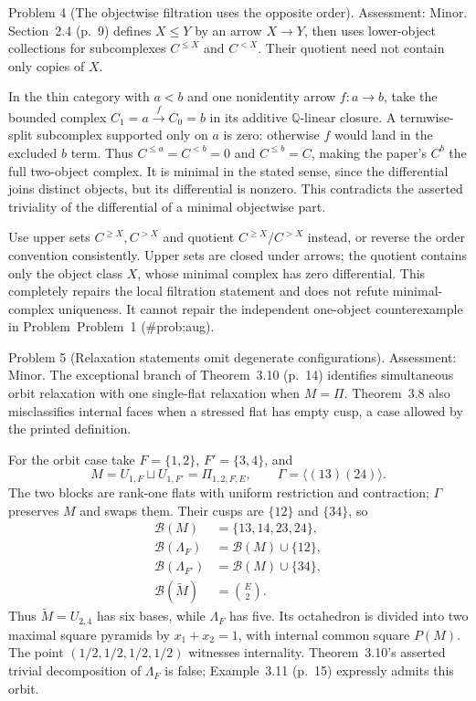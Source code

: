 \documentclass[10pt]{article}
\begin{document}
Problem 4 (The objectwise filtration uses the opposite order).  Assessment: Minor. Section 2.4 (p. 9) defines \(X\leq Y\) by an arrow \(X\to Y\), then uses lower-object collections for subcomplexes \(C^{\leq X}\) and \(C^{<X}\). Their quotient need not contain only copies of \(X\).\par
In the thin category with \(a<b\) and one nonidentity arrow \(f:a\to b\), take the bounded complex \(C_1=a\xrightarrow{f}C_0=b\) in its additive \(\mathbb Q\)-linear closure. A termwise-split subcomplex supported only on \(a\) is zero: otherwise \(f\) would land in the excluded \(b\) term. Thus \(C^{\leq a}=C^{<b}=0\) and \(C^{\leq b}=C\), making the paper’s \(C^b\) the full two-object complex. It is minimal in the stated sense, since the differential joins distinct objects, but its differential is nonzero. This contradicts the asserted triviality of the differential of a minimal objectwise part.\par
Use upper sets \(C^{\geq X},C^{>X}\) and quotient \(C^{\geq X}/C^{>X}\) instead, or reverse the order convention consistently. Upper sets are closed under arrows; the quotient contains only the object class \(X\), whose minimal complex has zero differential. This completely repairs the local filtration statement and does not refute minimal-complex uniqueness. It cannot repair the independent one-object counterexample in Problem Problem 1 (\#prob:aug).\par
Problem 5 (Relaxation statements omit degenerate configurations).  Assessment: Minor. The exceptional branch of Theorem 3.10 (p. 14) identifies simultaneous orbit relaxation with one single-flat relaxation when \(M=\Pi\). Theorem 3.8 also misclassifies internal faces when a stressed flat has empty cusp, a case allowed by the printed definition.\par
For the orbit case take \(F=\{1,2\}\), \(F'=\{3,4\}\), and \[M=U_{1,F}\sqcup U_{1,F'}=\Pi_{1,2,F,E},\qquad
 \Gamma=\langle(13)(24)\rangle.\] The two blocks are rank-one flats with uniform restriction and contraction; \(\Gamma\) preserves \(M\) and swaps them. Their cusps are \(\{12\}\) and \(\{34\}\), so \[\begin{aligned}
 \mathcal B(M)&=\{13,14,23,24\},\\
 \mathcal B(\Lambda_F)&=\mathcal B(M)\cup\{12\},\\
 \mathcal B(\Lambda_{F'})&=\mathcal B(M)\cup\{34\},\\
 \mathcal B(\widetilde M)&=\binom E2.
 \end{aligned}\] Thus \(\widetilde M=U_{2,4}\) has six bases, while \(\Lambda_F\) has five. Its octahedron is divided into two maximal square pyramids by \(x_1+x_2=1\), with internal common square \(P(M)\). The point \((1/2,1/2,1/2,1/2)\) witnesses internality. Theorem 3.10’s asserted trivial decomposition of \(\Lambda_F\) is false; Example 3.11 (p. 15) expressly admits this orbit.\par
\end{document}
